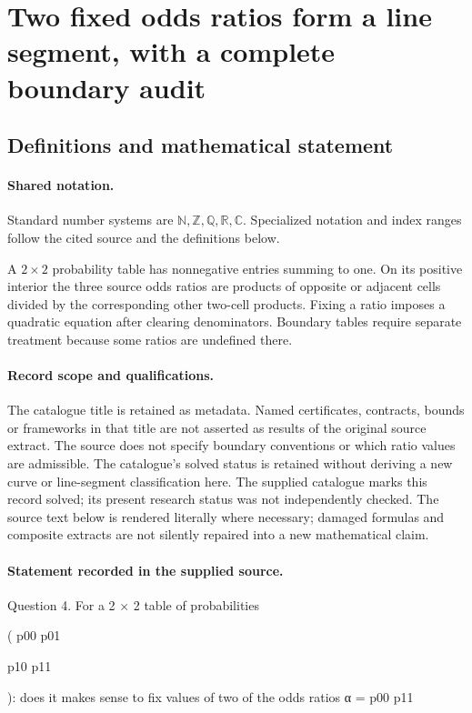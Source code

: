 \documentclass[11pt]{article}
\begin{document}
\section{Two fixed odds ratios form a line segment, with a complete boundary audit}\label{statement}

\subsection{Definitions and mathematical statement}

\paragraph{Shared notation.}Standard number systems are $\mathbb N,\mathbb Z,\mathbb Q,\mathbb R,\mathbb C$. Specialized notation and index ranges follow the cited source and the definitions below.


A $2\times2$ probability table has nonnegative entries summing to one. On its positive interior the three source odds ratios are products of opposite or adjacent cells divided by the corresponding other two-cell products. Fixing a ratio imposes a quadratic equation after clearing denominators. Boundary tables require separate treatment because some ratios are undefined there.
\paragraph{Record scope and qualifications.}
The catalogue title is retained as metadata. Named certificates, contracts, bounds or frameworks in that title are not asserted as results of the original source extract.
The source does not specify boundary conventions or which ratio values are admissible. The catalogue's solved status is retained without deriving a new curve or line-segment classification here. The supplied catalogue marks this record solved; its present research status was not independently checked.
The source text below is rendered literally where necessary; damaged formulas and composite extracts are not silently repaired into a new mathematical claim.
\paragraph{Statement recorded in the supplied source.}
Question 4. For a 2 × 2 table of probabilities

( p00 p01

p10 p11

): does it makes sense to fix values of two of the odds ratios α = p00 p11
\end{document}

